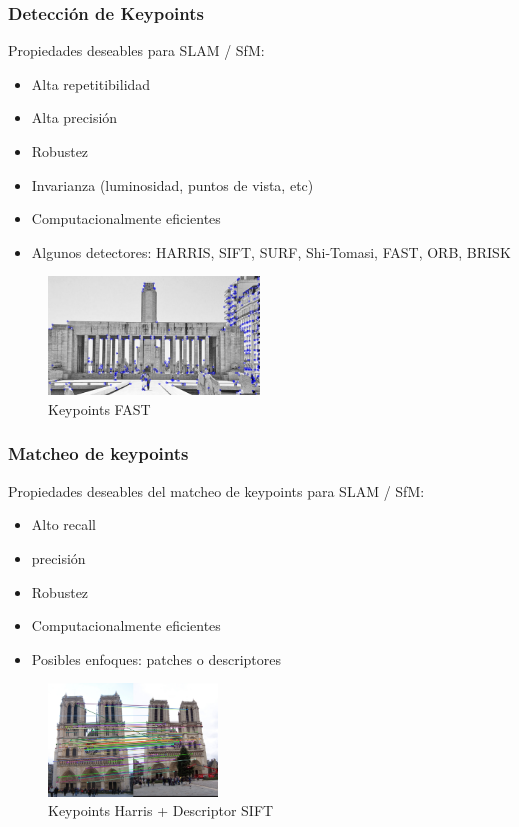 \begin{frame}
	\frametitle{Detección de Keypoints}
	
	
	
	\footnotesize
	Propiedades deseables para SLAM / SfM:
	\begin{itemize}
		\item Alta repetitibilidad
		\item Alta precisión
		\item Robustez
		\item Invarianza (luminosidad, puntos de vista, etc)
		\item Computacionalmente eficientes
		\item Algunos detectores: HARRIS, SIFT, SURF, Shi-Tomasi, FAST, ORB, BRISK
	\end{itemize}

	
	\begin{figure}
		\includegraphics[width=0.5\textwidth]{./images/keypoints_fast}
		\caption{Keypoints FAST}
	\end{figure}

\end{frame}


\begin{frame}
	\frametitle{Matcheo de keypoints}
	\footnotesize
	Propiedades deseables del matcheo de keypoints para SLAM / SfM:
	\begin{itemize}
		\item Alto recall
		\item precisión
		\item Robustez
		\item Computacionalmente eficientes
		\item Posibles enfoques: patches o descriptores
	\end{itemize}
	
	\begin{figure}
		\includegraphics[width=0.4\textwidth]{./images/matching_notredam.jpg}
		\caption{Keypoints Harris + Descriptor SIFT}
	\end{figure}
\end{frame}

